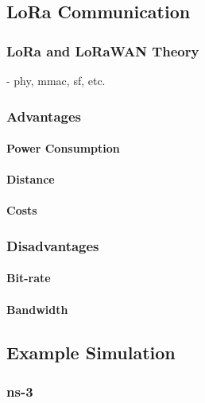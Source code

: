 \subsection{LoRa Communication}
\label{sec:euc_lora}

\subsubsection{LoRa and LoRaWAN Theory}

- phy, mmac, sf, etc. 

\subsubsection{Advantages}

\paragraph{Power Consumption}

\paragraph{Distance}

\paragraph{Costs}

\subsubsection{Disadvantages}

\paragraph{Bit-rate}

\paragraph{Bandwidth}

\subsection{Example Simulation}
\label{sec:euc_example_sim}

\subsubsection{ns-3}

